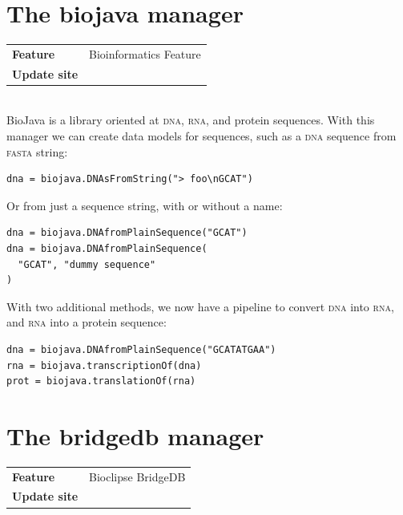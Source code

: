 \documentclass{book}
\begin{document}
\begin{refsection}

\section{The biojava manager}

\begin{tabular}{ll}
\textbf{Feature} & Bioinformatics Feature \\
\textbf{Update site} & \url{} \\
\end{tabular}\\

BioJava is a library oriented at \textsc{dna}, \textsc{rna}, and protein
sequences\cite{holland2008biojava,prlic2012biojava}.
With this manager we can create data models for sequences, such
as a \textsc{dna} sequence from \textsc{fasta} string:

\begin{Verbatim}
dna = biojava.DNAsFromString("> foo\nGCAT")
\end{Verbatim}

Or from just a sequence string, with or without a
name:

\begin{Verbatim}
dna = biojava.DNAfromPlainSequence("GCAT")
dna = biojava.DNAfromPlainSequence(
  "GCAT", "dummy sequence"
)
\end{Verbatim}

With two additional methods, we now have a pipeline to convert
\textsc{dna} into \textsc{rna}, and \textsc{rna} into a protein 
sequence:

\begin{Verbatim}
dna = biojava.DNAfromPlainSequence("GCATATGAA")
rna = biojava.transcriptionOf(dna)
prot = biojava.translationOf(rna)
\end{Verbatim}

\section{The bridgedb manager}

\begin{tabular}{ll}
\textbf{Feature} & Bioclipse BridgeDB \\
\textbf{Update site} & \url{} \\
\end{tabular} \\


\end{refsection}
\end{document}
